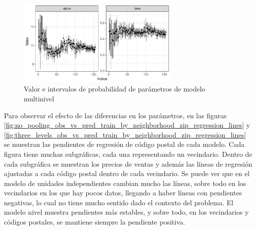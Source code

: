 \begin{figure}[H]
    \centering
    \includegraphics[width=0.7\textwidth]{images/three_levels_param_values.pdf}
    \caption{Valor e intervalos de probabilidad de parámetros de modelo multinivel}
    \label{fig:three_levels_param_values}
\end{figure}

Para observar el efecto de las diferencias en los parámetros, en las figuras \ref{fig:no_pooling_obs_vs_pred_train_by_neighborhood_zip_regression_lines} y \ref{fig:three_levels_obs_vs_pred_train_by_neighborhood_zip_regression_lines} se muestran las pendientes de regresión de código postal de cada modelo. Cada figura tiene muchas subgráficas, cada una representando un vecindario. Dentro de cada subgráfica se muestran los precios de ventas y además las líneas de regresión ajustadas a cada código postal dentro de cada vecindario. Se puede ver que en el modelo de unidades independientes cambian mucho las líneas, sobre todo en los vecindarios en los que hay pocos datos, llegando a haber líneas con pendientes negativas, lo cual no tiene mucho sentido dado el contexto del problema. El modelo nivel muestra pendientes más estables, y sobre todo, en los vecindarios y códigos postales, se mantiene siempre la pendiente positiva.

